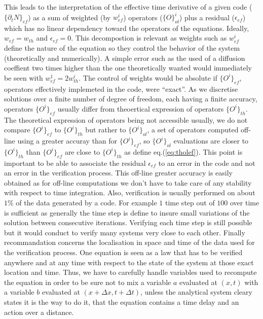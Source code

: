 \documentclass[12pt,a4paper]{paper}
\newcommand{\acc}[2]{ \{ #1 \}_{#2} }
\begin{document}
%
This leads to the interpretation of the effective time derivative of a given code ($\acc{\partial_t N}{ef}$) as a sum of weighted (by $w^i_{ef}$) operators ($\acc{O}{ol}^i$) plus a residual ($\epsilon_{ef}$) which has no linear dependency toward the operators of the equations. Ideally, $w_{ef} = w_{th}$ and $\epsilon_{ef} = 0$.
%
This decompostion is relevant as weights such as $w^i_{ef}$ define the nature of the equation so they control the behavior of the system (theoretically and numerically).
A simple error such as the used of a diffusion coeffient two times higher than the one theoretically wanted would immediately be seen with $w^1_{ef} = 2 w^i_{th}$.
The control of weights would be absolute if $\acc{O^i}{ef}$, operators effectively implemeted in the code, were ``exact''. As we discretise solutions over a finite number of degree of freedom, each having a finite accuracy, operators $\acc{O^i}{ef}$ usually differ from theoertical expression of operators $\acc{O^i}{th}$. The theoretical expression of operators being not accessible usually, we do not compare $\acc{O^i}{ef}$ to $\acc{O^i}{th}$ but rather to $\acc{O^i}{ol}$, a set of operators computed off-line using a greater accuray than for $\acc{O^i}{ef}$, so $\acc{O^i}{ol}$ evaluations are closer to $\acc{O^i}{th}$ than $\acc{O^i}{ef}$ are close to $\acc{O^i}{th}$ as define eq.(\ref{eq:tholef}). This point is important to be able to associate the residual $\epsilon_{ef}$ to an error in the code and not an error in the verification process. This off-line greater accuracy is easily obtained as for off-line computations we don't have to take care of any stability with respect to time integration.
Also, verification is usually performed on about $1\%$ of the data generated by a code. For example $1$ time step out of $100$ over time is sufficient as generally the time step is define to insure small variations of the solution between consecutive iterations. Verifying each time step is still possible but it would conduct to verify many systems very close to each other.
Finally recommandation concerns the localisation in space and time of the data used for the verification process. One equation is seen as a law that has to be verified anywhere and at any time with respect to the state of the system at those exact location and time. Thus, we have to carefully handle variables used to recompute the equation in order to be sure not to mix a variable $a$ evaluated at $(x,t)$ with a variable $b$ evaluated at $(x+\Delta x, t+\Delta t)$, unless the analytical system cleary states it is the way to do it, that the equation contains a time delay and an action over a distance.
%
\end{document}
